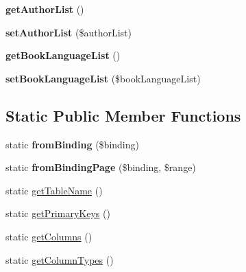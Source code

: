 \begin{DoxyCompactItemize}
\item 
\hypertarget{classBook_a6321d8c999c82a60e10863487edccc5f}{
{\bfseries getAuthorList} ()}
\label{classBook_a6321d8c999c82a60e10863487edccc5f}

\item 
\hypertarget{classBook_a1f56acc7049b6564d95706d8a0c30793}{
{\bfseries setAuthorList} (\$authorList)}
\label{classBook_a1f56acc7049b6564d95706d8a0c30793}

\item 
\hypertarget{classBook_ac09af067ad1ff35f374282bc405dd427}{
{\bfseries getBookLanguageList} ()}
\label{classBook_ac09af067ad1ff35f374282bc405dd427}

\item 
\hypertarget{classBook_af280a15556b5368067fc42b964a71554}{
{\bfseries setBookLanguageList} (\$bookLanguageList)}
\label{classBook_af280a15556b5368067fc42b964a71554}

\end{DoxyCompactItemize}
\subsection*{Static Public Member Functions}
\begin{DoxyCompactItemize}
\item 
\hypertarget{classBook_af0d410f2c2da5f56b57c8f3e59d799a6}{
static {\bfseries fromBinding} (\$binding)}
\label{classBook_af0d410f2c2da5f56b57c8f3e59d799a6}

\item 
\hypertarget{classBook_a4ec502681f3507edb7c64bb012463d33}{
static {\bfseries fromBindingPage} (\$binding, \$range)}
\label{classBook_a4ec502681f3507edb7c64bb012463d33}

\item 
static \hyperlink{classBook_ae4b3d3747fad76af4e4724a4bcf749a3}{getTableName} ()
\item 
static \hyperlink{classBook_ae2a08ea5916ed402169f59b6ad853d13}{getPrimaryKeys} ()
\item 
static \hyperlink{classBook_a26e48647691c869f9de967b1e5e2e49d}{getColumns} ()
\item 
static \hyperlink{classBook_afeabb3df0ca3af21d93d2c6d2be84fe6}{getColumnTypes} ()
\end{DoxyCompactItemize}
